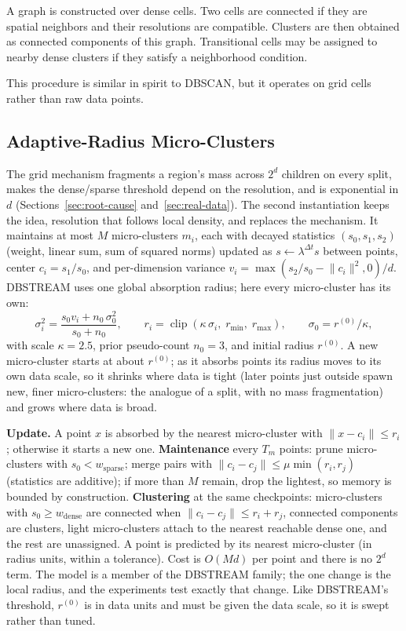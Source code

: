 \documentclass[11pt]{article}
\begin{document}
A graph is constructed over dense cells. Two cells are connected if they are spatial neighbors and their resolutions are compatible. Clusters are then obtained as connected components of this graph. Transitional cells may be assigned to nearby dense clusters if they satisfy a neighborhood condition.

This procedure is similar in spirit to DBSCAN, but it operates on grid cells rather than raw data points.

\subsection{Adaptive-Radius Micro-Clusters}
\label{sec:mc-method}

The grid mechanism fragments a region's mass across $2^d$ children on every split, makes the dense/sparse threshold depend on the resolution, and is exponential in $d$ (Sections~\ref{sec:root-cause} and~\ref{sec:real-data}). The second instantiation keeps the idea, resolution that follows local density, and replaces the mechanism. It maintains at most $M$ micro-clusters $m_i$, each with decayed statistics $(s_0, s_1, s_2)$ (weight, linear sum, sum of squared norms) updated as $s \leftarrow \lambda^{\Delta t}s$ between points, center $c_i = s_1/s_0$, and per-dimension variance $v_i = \max(s_2/s_0 - \lVert c_i\rVert^2, 0)/d$. DBSTREAM uses one global absorption radius; here every micro-cluster has its own:
\begin{equation}
\sigma_i^2 = \frac{s_0 v_i + n_0\,\sigma_0^2}{s_0 + n_0},\qquad
r_i = \operatorname{clip}\!\left(\kappa\,\sigma_i,\; r_{\min},\; r_{\max}\right),\qquad \sigma_0 = r^{(0)}/\kappa,
\end{equation}
with scale $\kappa=2.5$, prior pseudo-count $n_0=3$, and initial radius $r^{(0)}$. A new micro-cluster starts at about $r^{(0)}$; as it absorbs points its radius moves to its own data scale, so it shrinks where data is tight (later points just outside spawn new, finer micro-clusters: the analogue of a split, with no mass fragmentation) and grows where data is broad.

\textbf{Update.} A point $x$ is absorbed by the nearest micro-cluster with $\lVert x - c_i\rVert \leq r_i$; otherwise it starts a new one. \textbf{Maintenance} every $T_m$ points: prune micro-clusters with $s_0 < w_{\text{sparse}}$; merge pairs with $\lVert c_i - c_j\rVert \leq \mu \min(r_i, r_j)$ (statistics are additive); if more than $M$ remain, drop the lightest, so memory is bounded by construction. \textbf{Clustering} at the same checkpoints: micro-clusters with $s_0 \geq w_{\text{dense}}$ are connected when $\lVert c_i - c_j\rVert \leq r_i + r_j$, connected components are clusters, light micro-clusters attach to the nearest reachable dense one, and the rest are unassigned. A point is predicted by its nearest micro-cluster (in radius units, within a tolerance). Cost is $O(Md)$ per point and there is no $2^d$ term. The model is a member of the DBSTREAM family; the one change is the local radius, and the experiments test exactly that change. Like DBSTREAM's threshold, $r^{(0)}$ is in data units and must be given the data scale, so it is swept rather than tuned.
\end{document}
